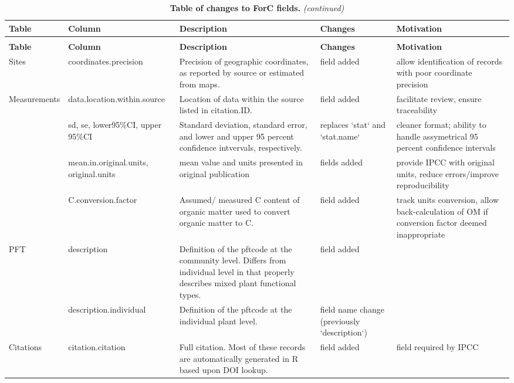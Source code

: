 \documentclass[, manuscript]{copernicus}
\begin{document}
\begin{longtabu} to 
\caption{\label{tab:table_ForCchanges}\textbf{Table of changes to ForC fields.}}\\
\hline
\textbf{Table} & \textbf{Column} & \textbf{Description} & \textbf{Changes} & \textbf{Motivation}\\
\hline
\endfirsthead
\caption[]{\textbf{Table of changes to ForC fields.} \textit{(continued)}}\\
\hline
\textbf{Table} & \textbf{Column} & \textbf{Description} & \textbf{Changes} & \textbf{Motivation}\\
\hline
\endhead
Sites & coordinates.precision & Precision of geographic coordinates, as reported by source or estimated from maps. & field added & allow identification of records with poor coordinate precision\\
\hline
Measurements & data.location.within.source & Location of data within the source listed in citation.ID. & field added & facilitate review, ensure traceability\\
\hline
 & sd, se, lower95\%CI, upper 95\%CI & Standard deviation, standard error, and lower and upper 95 percent confidence intvervals, respectively. & replaces `stat` and `stat.name` & cleaner format; ability to handle assymetrical 95 percent confidence intervals\\
\hline
 & mean.in.original.units, original.units & mean value and units presented in original publication & fields added & provide IPCC with original units, reduce errors/improve reproducibility\\
\hline
 & C.conversion.factor & Assumed/ measured C content of organic matter used to convert organic matter to C. & field added & track units conversion, allow back-calculation of OM if conversion factor deemed inappropriate\\
\hline
PFT & description & Definition of the pftcode at the community level. Differs from individual level in that properly describes mixed plant functional types. & field added & \\
\hline
 & description.individual & Definition of the pftcode at the individual plant level. & field name change (previously `description`) & \\
\hline
Citations & citation.citation & Full citation. Most of these records are automatically generated in R based upon DOI lookup. & field added & field required by IPCC\\
\hline

\end{longtabu}
\end{document}
